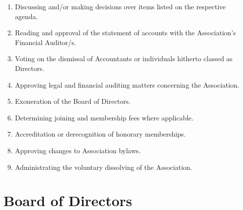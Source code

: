 \begin{enumerate}
\item Discussing and/or making decisions over items listed on the respective agenda.
\item Reading and approval of the statement of accounts with the Association’s Financial Auditor/s.
\item Voting on the dismissal of Accountants or individuals hitherto classed as Directors.
\item Approving legal and financial auditing matters concerning the Association.
\item Exoneration of the Board of Directors.
\item Determining joining and membership fees where applicable.
\item Accreditation or derecognition of honorary memberships.
\item Approving changes to Association bylaws.
\item Administrating the voluntary dissolving of the Association.
\end{enumerate}





\section{Board of Directors}


